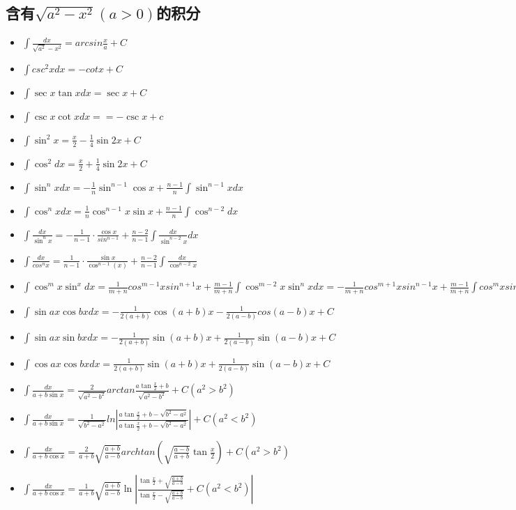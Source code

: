 \subsection{含有$\sqrt{a^2-x^2}(a>0)$的积分}
\begin{itemize}
	\item $\int\frac{dx}{\sqrt{a^2}-x^2}=arcsin\frac{x}{a}+C$
	\item $\int csc^2xdx=-cotx+C$
	\item $\int \sec x \tan xdx=\sec x+C$
	\item $\int\csc x \cot xdx = =-\csc x+c$
	\item $\int \sin^2x=\frac{x}{2}-\frac{1}{4}\sin2x+C$
	\item $\int \cos^2dx=\frac{x}{2}+\frac{1}{4}\sin2x+C$
	\item $\int \sin^nxdx = -\frac{1}{n}\sin^{n-1}\cos x+\frac{n-1}{n}\int\sin^{n-1}xdx$
	\item $\int \cos^nxdx = \frac{1}{n}\cos^{n-1}x\sin x+\frac{n-1}{n}\int\cos^{n-2}dx$
	\item $\int \frac{dx}{\sin^nx}=-\frac{1}{n-1}\cdot \frac{\cos x}{sin^{n-1}}+\frac{n-2}{n-1}\int\frac{dx}{\sin^{n-2}x}dx$
	\item $\int \frac{dx}{cos^nx}=\frac{1}{n-1}\cdot \frac{\sin x}{\cos^{n-1}(x)}+\frac{n-2}{n-1}\int \frac{dx}{\cos^{n-2}x}$
	\item $\int \cos^mx\sin^xdx=\frac{1}{m+n}cos^{m-1}xsin^{n+1}x+\frac{m-1}{m+n}\int\cos^{m-2}x\sin^nxdx=-\frac{1}{m+n}cos^{m+1}xsin^{n-1}x+\frac{m-1}{m+n}\int cos^mxsin^{n-2}xdx$
	\item $\int \sin ax\cos bxdx = -\frac{1}{2(a+b)}\cos(a+b)x-\frac{1}{2(a-b)}cos(a-b)x+C$
	\item $\int \sin ax\sin bxdx=-\frac{1}{2(a+b)}\sin(a+b)x+\frac{1}{2(a-b)}\sin(a-b)x+C$
	\item $\int \cos ax \cos bxdx=\frac{1}{2(a+b)}\sin(a+b)x+\frac{1}{2(a-b)}\sin(a-b)x+C$
	\item $\int \frac{dx}{a+b\sin x}=\frac{2}{\sqrt{a^2-b^2}}arctan\frac{a\tan\frac{x}{2}+b}{\sqrt{a^2-b^2}}+C(a^2>b^2)$
	\item $\int \frac{dx}{a+b\sin x}=\frac{1}{\sqrt{b^2-a^2}}ln|\frac{a\tan\frac{x}{2}+b-\sqrt{b^2-a^2}}{a\tan\frac{x}{2}+b-\sqrt{b^2-a^2}}|+C(a^2<b^2)$
	\item $\int\frac{dx}{a+b\cos x}=\frac{2}{a+b}\sqrt{\frac{a+b}{a-b}}archtan\left(\sqrt{\frac{a-b}{a+b}}\tan\frac{x}{2}\right)+C(a^2>b^2)$
	\item $\int \frac{dx}{a+b\cos x}=\frac{1}{a+b}\sqrt{\frac{a+b}{a-b}}\ln|\frac{\tan\frac{x}{2}+\sqrt{\frac{a+b}{a-b}}}{\tan\frac{x}{2}-\sqrt{\frac{a+b}{a-b}}}+C(a^2<b^2)| $

\end{itemize}

